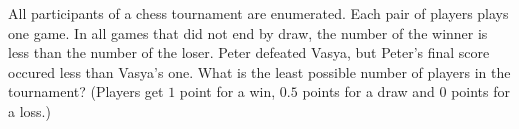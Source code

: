 \problem{}
All participants of a chess tournament are enumerated.
Each pair of players plays one game.
In all games that did not end by draw, the number of the winner is less than the number of the loser.
Peter defeated Vasya, but Peter's final score occured less than Vasya's one.
What is the least possible number of players in the tournament?
(Players get $1$ point for a win, $0.5$ points for a draw and $0$ points for a loss.)
\solution
\endproblem
